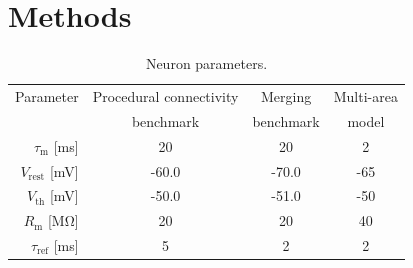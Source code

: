 \documentclass[9pt,a4paper]{amsart}
\begin{document}
\section{Methods}
\begin{table}
  \centering
  \begin{tabular}{r S S S}
    \toprule
        {Parameter}                             & {Procedural connectivity} & {Merging}         & {Multi-area} \\
                                                & {benchmark}               & {benchmark}       & {model} \\
    \midrule
        $\tau_{\text{m}}$ [\si{\milli\second}]         & 20                        & 20                & 2 \\
        $V_{\text{rest}}$ [\si{\milli\volt}]           & -60.0                     & -70.0             & -65 \\
       
        $V_{\text{th}}$ [\si{\milli\volt}]         & -50.0                     & -51.0             & -50 \\
        $R_{\text{m}}$ [\si{\mega\ohm}]                  & 20                        & 20                & 40 \\
        $\tau_{\text{ref}}$ [\si{\milli\second}]       & 5                         & 2                 & 2 \\
    \bottomrule
  \end{tabular}
  \caption{Neuron parameters.}
  \label{tab:parameters}
\end{table}
\end{document}
